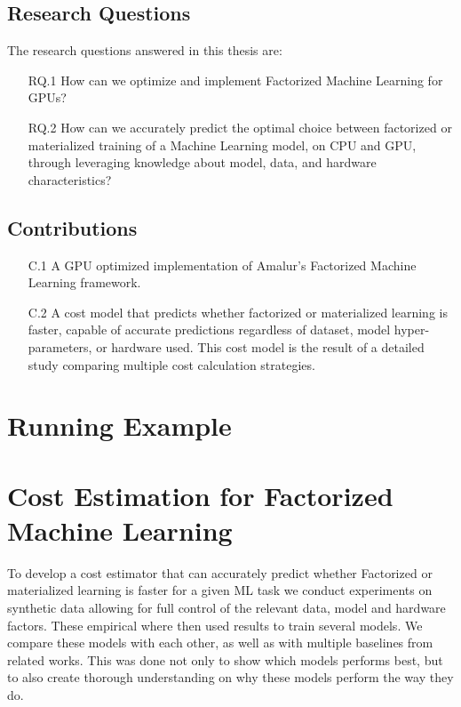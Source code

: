 \subsection{Research Questions}
The research questions answered in this thesis are:
\begin{itemize}
    \item[RQ.1] How can we optimize and implement Factorized Machine Learning for GPUs?
    \item[RQ.2] How can we accurately predict the optimal choice between factorized or materialized training of a Machine Learning model, on CPU and GPU, through leveraging knowledge about model, data, and hardware characteristics?
\end{itemize}

\subsection{Contributions}
\begin{enumerate}
    \item[C.1] A GPU optimized implementation of Amalur's Factorized Machine Learning framework.
    \item[C.2] A cost model that predicts whether factorized or materialized learning is faster, capable of accurate predictions regardless of dataset, model hyper-parameters, or hardware used. This cost model is the result of a detailed study comparing multiple cost calculation strategies.
\end{enumerate}

\section{Running Example}

\section{Cost Estimation for Factorized Machine Learning}
To develop a cost estimator that can accurately predict whether Factorized or materialized learning is faster for a given ML task we conduct experiments on synthetic data allowing for full control of the relevant data, model and hardware factors. These empirical where then used results to train several models. We compare these models with each other, as well as with multiple baselines from related works. This was done not only to show which models performs best, but to also create thorough understanding on why these models perform the way they do.


